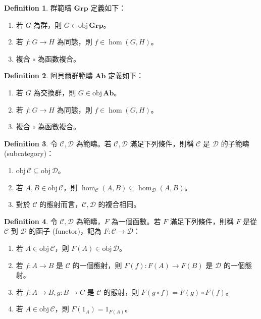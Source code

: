 \documentclass[12pt]{article}
\theoremstyle{definition}
\newtheorem{definition}{Definition}[section]
\newcommand\<{\langle}
\renewcommand\>{\rangle}
\newcommand\obj{\mathrm{obj}\hspace{2pt}}
\begin{document}
\begin{CJK}{UTF8}{bsmi}
\begin{definition}
    群範疇 $\textbf{Grp}$ 定義如下：
    \begin{enumerate}
        \item 若 $G$ 為群，則 $G\in\obj\textbf{Grp}$。
        \item 若 $f:G\to H$ 為同態，則 $f\in\hom(G, H)$。
        \item 複合 $\circ$ 為函數複合。
    \end{enumerate}
\end{definition}

\begin{definition}
    阿貝爾群範疇 $\textbf{Ab}$ 定義如下：
    \begin{enumerate}
        \item 若 $G$ 為交換群，則 $G\in\obj\textbf{Ab}$。
        \item 若 $f:G\to H$ 為同態，則 $f\in\hom(G, H)$。
        \item 複合 $\circ$ 為函數複合。
    \end{enumerate}
\end{definition}

\begin{definition}
    令 $\mathcal{C}, \mathcal{D}$ 為範疇。若 $\mathcal{C}, \mathcal{D}$ 滿足下列條件，則稱 $\mathcal{C}$ 是 $\mathcal{D}$ 的子範疇 (subcategory)：
    \begin{enumerate}
        \item $\obj\mathcal{C}\subseteq\obj\mathcal{D}$。
        \item 若 $A, B\in\obj\mathcal{C}$，則 $\hom_{\mathcal{C}}(A, B)\subseteq\hom_{\mathcal{D}}(A, B)$。
        \item 對於 $\mathcal{C}$ 的態射而言，$\mathcal{C}, \mathcal{D}$ 的複合相同。
    \end{enumerate}
\end{definition}

\begin{definition}
    令 $\mathcal{C}, \mathcal{D}$ 為範疇，$F$ 為一個函數。若 $F$ 滿足下列條件，則稱 $F$ 是從 $\mathcal{C}$ 到 $\mathcal{D}$ 的函子 (functor)，記為 $F:\mathcal{C}\to\mathcal{D}$：
    \begin{enumerate}
        \item 若 $A\in\obj\mathcal{C}$，則 $F(A)\in\obj\mathcal{D}$。
        \item 若 $f:A\to B$ 是 $\mathcal{C}$ 的一個態射，則 $F(f):F(A)\to F(B)$ 是 $\mathcal{D}$ 的一個態射。
        \item 若 $f:A\to B, g:B\to C$ 是 $\mathcal{C}$ 的態射，則 $F(g\circ f)=F(g)\circ F(f)$。
        \item 若 $A\in\obj\mathcal{C}$，則 $F(1_A)=1_{F(A)}$。
    \end{enumerate}
\end{definition}


\end{CJK}
\end{document}

